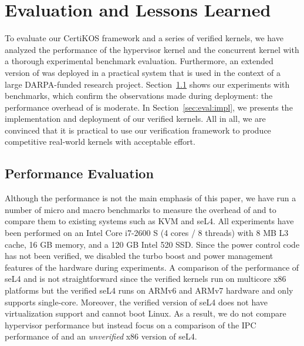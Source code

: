 
\chapter{Evaluation and Lessons Learned}
\label{chap-eval}
To evaluate
our CertiKOS framework
and a series of verified kernels,
we have analyzed the performance of the \mCTOShyper{} hypervisor kernel and the  \cCTOS{} concurrent kernel
with a thorough experimental benchmark evaluation.
Furthermore, an extended version of \mCTOShyper{}
was deployed in a practical system that is used in the context of a
large DARPA-funded research project. 
Section~\ref{sec:eval:perform} shows our experiments with benchmarks, which
confirm the observations made during deployment: the performance
overhead of \mCTOShyper{} is moderate. 
In Section~\ref{sec:eval:impl},
we presents the implementation and deployment of
our verified kernels.
All in all, we are convinced that it is
practical to use our verification framework to produce competitive
real-world kernels with acceptable effort.


\section{Performance Evaluation} 
\label{sec:eval:perform}
Although the performance is not the main emphasis of this paper, we
have run a number of micro and macro benchmarks to measure the
overhead of {\mCTOS} and {\cCTOS}
to compare them to existing systems such
as KVM and seL4. All experiments have been performed on an Intel Core
i7-2600 S (4 cores / 8 threads) with 8 MB L3 cache, 16 GB memory, and
a 120 GB Intel 520 SSD. Since the power control code has not been
verified, we disabled the turbo boost and power management features of
the hardware during experiments.
A comparison of the performance of seL4 and \cCTOS{} is not
straightforward since the verified \cCTOS{} kernels run on 
multicore
x86
platforms but the verified seL4 runs on ARMv6
and ARMv7 hardware and only supports single-core. Moreover, the
verified version of seL4 does not have virtualization support and
cannot boot Linux. As a result, we do not compare hypervisor
performance but instead focus on a comparison of the IPC performance
of {\cCTOS} and an \emph{unverified} x86 version of seL4.


